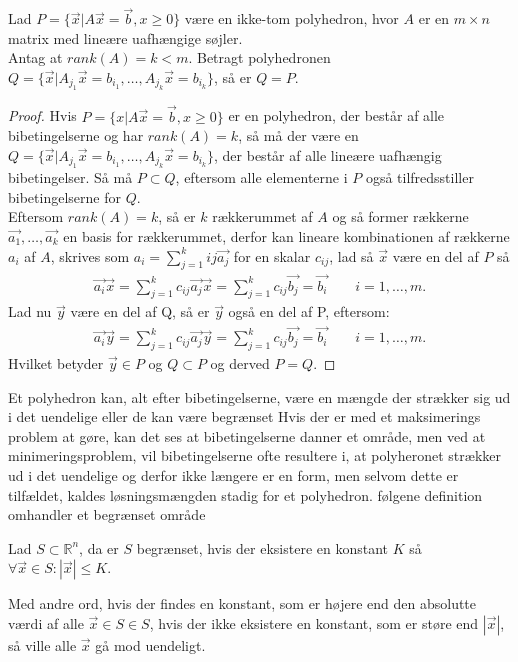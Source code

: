 \begin{stn} 
Lad $P=\{\vec{x}|A\vec{x}=\vec{b},x\geq 0\}$ være en ikke-tom polyhedron, hvor $A$ er en $m\times n$ matrix med lineære uafhængige søjler.\\
Antag at $rank(A)=k<m$. Betragt polyhedronen $Q=\{\vec{x}|A_{j_1}\vec{x}=b_{i_1},\dots ,A_{j_k}\vec{x}=b_{i_k}\}$, så er $Q=P$.
\end{stn}
\begin{proof}
Hvis $P=\{x|A\vec{x}=\vec{b},x\geq 0\}$ er en polyhedron, der består af alle bibetingelserne og har $rank(A)=k$, så må der være en $Q=\{\vec{x}|A_{j_1}\vec{x}=b_{i_1},\dots ,A_{j_k}\vec{x}=b_{i_k}\}$, der består af alle lineære uafhængig bibetingelser. Så må $P\subset Q$, eftersom alle elementerne i $P$ også tilfredsstiller bibetingelserne for $Q$.\\
Eftersom $rank(A)=k$, så er $k$ rækkerummet af $A$ og så former rækkerne $\vec{a_1},\dots ,\vec{a_k}$ en basis for rækkerummet, derfor kan lineare kombinationen af rækkerne $a_i$ af $A$, skrives som $a_i=\sum_{j=1}^{k}{i j}\vec{a_j}$ for en skalar $c_{i j}$, lad så $\vec{x}$ være en del af $P$ så
\begin{align*}
\vec{a_i}\vec{x}=\sum_{j=1}^{k}c_{i j}\vec{a_j}\vec{x}=\sum_{j=1}^{k}c_{i j}\vec{b_j}=\vec{b_i} \qquad i=1,\dots,m.
\end{align*}
Lad nu $\vec{y}$ være en del af Q, så er $\vec{y}$ også en del af P, eftersom:
\begin{align*}
\vec{a_i}\vec{y}=\sum_{j=1}^{k}c_{i j}\vec{a_j}\vec{y}=\sum_{j=1}^{k}c_{i j}\vec{b_j}=\vec{b_i} \qquad i=1,\dots,m.
\end{align*}
Hvilket betyder $\vec{y}\in P$ og $Q\subset P$ og derved $P=Q$.
\end{proof}
Et polyhedron kan, alt efter bibetingelserne, være en mængde der strækker sig ud i det uendelige eller de kan være begrænset 
Hvis der er med et maksimerings problem at gøre, kan det ses at bibetingelserne danner et område, men ved at minimeringsproblem, vil bibetingelserne ofte resultere i, at polyheronet strækker ud i det uendelige og derfor ikke længere er en form, men selvom dette er tilfældet, kaldes løsningsmængden stadig for et polyhedron.
følgene definition omhandler et begrænset område
\begin{defn} [Begrænset]
Lad $S \subset \mathds{R}^n$, da er $S$ begrænset, hvis der eksistere en konstant $K$ så $\forall \vec{x} \in S: |\vec{x}| \leq K$.
\end{defn}
Med andre ord, hvis der findes en konstant, som er højere end den absolutte værdi af alle $\vec{x} \in S \in S$, hvis der ikke eksistere en konstant, som er støre end $|\vec{x}|$, så ville alle $\vec{x}$ gå mod uendeligt.

